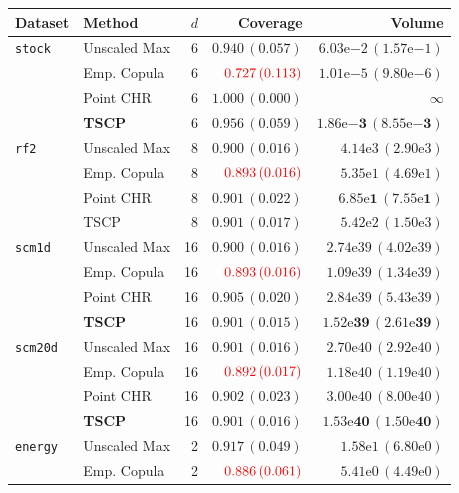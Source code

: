 \begin{table}[!htbp]
\centering
\small
\begin{tabular}{llrrr}
\toprule
Dataset & Method & $d$ & Coverage & Volume \\
\midrule
\texttt{stock} & Unscaled Max & 6 & $0.940\,(0.057)$ & $6.03\mathrm{e}{-2}\,(1.57\mathrm{e}{-1})$ \\
 & Emp. Copula & 6 & $\color{red} 0.727\,(0.113)$ & $1.01\mathrm{e}{-5}\,(9.80\mathrm{e}{-6})$ \\
 & Point CHR & 6 & $1.000\,(0.000)$ & $\infty$ \\
 & \textbf{TSCP} & 6 & $0.956\,(0.059)$ & $\mathbf{1.86\mathrm{e}{-3}\,(8.55\mathrm{e}{-3})}$ \\
\addlinespace
\texttt{rf2} & Unscaled Max & 8 & $0.900\,(0.016)$ & $4.14\mathrm{e}{3}\,(2.90\mathrm{e}{3})$ \\
 & Emp. Copula & 8 & $\color{red}0.893\,(0.016)$ & $5.35\mathrm{e}{1}\,(4.69\mathrm{e}{1})$ \\
 & Point CHR & 8 & $0.901\,(0.022)$ & $\mathbf{6.85\mathrm{e}{1}\,(7.55\mathrm{e}{1})}$ \\
 & TSCP & 8 & $0.901\,(0.017)$ & $5.42\mathrm{e}{2}\,(1.50\mathrm{e}{3})$ \\
\addlinespace
\texttt{scm1d} & Unscaled Max & 16 & $0.900\,(0.016)$ & $2.74\mathrm{e}{39}\,(4.02\mathrm{e}{39})$ \\
 & Emp. Copula & 16 & $\color{red}0.893\,(0.016)$ & $1.09\mathrm{e}{39}\,(1.34\mathrm{e}{39})$ \\
 & Point CHR & 16 & $0.905\,(0.020)$ & $2.84\mathrm{e}{39}\,(5.43\mathrm{e}{39})$ \\
 & \textbf{TSCP} & 16 & $0.901\,(0.015)$ & $\mathbf{1.52\mathrm{e}{39}\,(2.61\mathrm{e}{39})}$ \\
\addlinespace
\texttt{scm20d} & Unscaled Max & 16 & $0.901\,(0.016)$ & $2.70\mathrm{e}{40}\,(2.92\mathrm{e}{40})$ \\
 & Emp. Copula & 16 & $\color{red}0.892\,(0.017)$ & $1.18\mathrm{e}{40}\,(1.19\mathrm{e}{40})$ \\
 & Point CHR & 16 & $0.902\,(0.023)$ & $3.00\mathrm{e}{40}\,(8.00\mathrm{e}{40})$ \\
 & \textbf{TSCP} & 16 & $0.901\,(0.016)$ & $\mathbf{1.53\mathrm{e}{40}\,(1.50\mathrm{e}{40})}$ \\
\addlinespace
\texttt{energy} & Unscaled Max & 2 & $0.917\,(0.049)$ & $1.58\mathrm{e}{1}\,(6.80\mathrm{e}{0})$ \\
 & Emp. Copula & 2 & ${\color{red}0.886\,(0.061)}$ & $5.41\mathrm{e}{0}\,(4.49\mathrm{e}{0})$ \\

\end{tabular}
\end{table}
